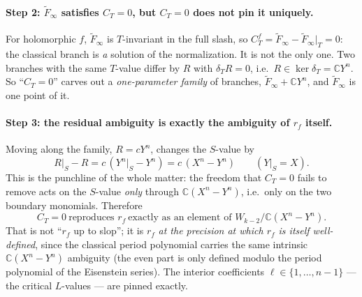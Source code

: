 \documentclass[11pt]{article}
\newcommand{\CC}{\mathbb{C}}
\newcommand{\Eich}{\widetilde{F}}
\begin{document}
\paragraph{Step 2: $\Eich_\infty$ satisfies $C_T = 0$, but $C_T = 0$ does
not pin it uniquely.} For holomorphic $f$, $\Eich_\infty$ is $T$-invariant
in the full slash, so
$C^f_T = \Eich_\infty - \Eich_\infty|_T = 0$: the classical branch is
\emph{a} solution of the normalization. It is not the only one. Two
branches with the same $T$-value differ by $R$ with $\delta_T R = 0$,
i.e.\ $R \in \ker\delta_T = \CC Y^n$. So ``$C_T = 0$'' carves out a
\emph{one-parameter family} of branches, $\Eich_\infty + \CC Y^n$, and
$\Eich_\infty$ is one point of it.

\paragraph{Step 3: the residual ambiguity is exactly the ambiguity of
$r_f$ itself.} Moving along the family, $R = cY^n$, changes the $S$-value
by
\[
  R\big|_S - R = c\,(Y^n|_S - Y^n) = c\,(X^n - Y^n)
  \qquad (Y|_S = X).
\]
This is the punchline of the whole matter: the freedom that $C_T = 0$
fails to remove acts on the $S$-value \emph{only} through
$\CC(X^n - Y^n)$, i.e.\ only on the two boundary monomials. Therefore
\[
  \boxed{\ C_T = 0 \ \text{reproduces } r_f \ \text{exactly as an element of }
  W_{k-2}/\CC(X^n - Y^n).\ }
\]
That is not ``$r_f$ up to slop''; it is $r_f$ \emph{at the precision at
which $r_f$ is itself well-defined}, since the classical period
polynomial carries the same intrinsic $\CC(X^n - Y^n)$ ambiguity (the
even part is only defined modulo the period polynomial of the Eisenstein
series). The interior coefficients $\ell \in \{1,\dots,n-1\}$ --- the
critical $L$-values --- are pinned exactly.

\end{document}
